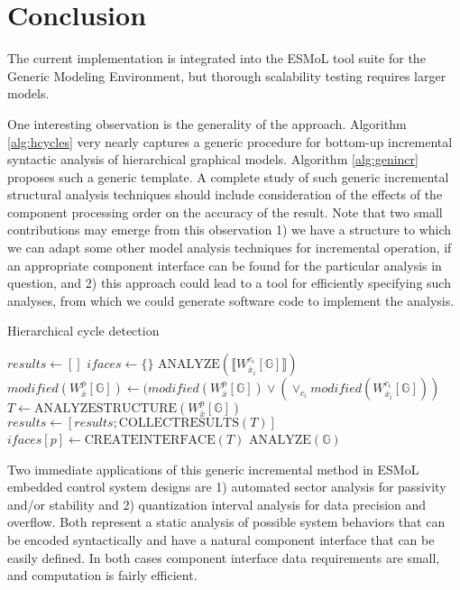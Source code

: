 \section{Conclusion}

The current implementation is integrated into the ESMoL tool suite for the Generic Modeling Environment\cite{mic:gme}, but thorough scalability testing requires larger models.

One interesting observation is the generality of the approach.  Algorithm 
\ref{alg:hcycles} very nearly captures a generic procedure for bottom-up incremental syntactic analysis of hierarchical graphical models.  Algorithm \ref{alg:genincr} proposes such a generic template.  A complete study of such generic 
incremental structural analysis techniques should include consideration of the effects of the component processing order on the accuracy of the result.  Note that two small contributions may emerge from this observation 1) we have a structure to which we can adapt some other model analysis techniques for incremental operation, if an appropriate component interface can be found for the particular analysis in question, and 2) this approach could lead to a tool for efficiently specifying such analyses, from which we could generate software code to implement the analysis.

\begin{algorithm}[H]
\caption{Hierarchical cycle detection}
\label{alg:genincr}
\begin{algorithmic}[1]
\State $results \gets [ ]$
\State $ifaces \gets \{ \}$
      \State ${\scriptstyle \mathrm{ANALYZE}}( \llbracket W_{\bar{x}_i}^{c_i} [\mathbb{G}] \rrbracket )$
   \EndFor
   \State $modified( W_{\bar{x}}^p [\mathbb{G}]) \gets (modified( W_{\bar{x}}^p [\mathbb{G}]) \vee ( \vee_{c_i} modified( W_{\bar{x}_i}^{c_i} [\mathbb{G}] ) )$
      \State $T \gets {\scriptstyle \mathrm{ANALYZESTRUCTURE}}(W_{\bar{x}}^p [\mathbb{G}])$
      \State $results \gets [ results; {\scriptstyle \mathrm{COLLECTRESULTS}}( T ) ]$
      \State $ifaces[p] \gets {\scriptstyle \mathrm{CREATEINTERFACE}}(T)$
   \EndIf
\EndFunction
\State ${\scriptstyle \mathrm{ANALYZE}}( \mathbb{G}) $
\end{algorithmic}
\end{algorithm}

Two immediate applications of this generic incremental method in ESMoL embedded control system designs are 1) automated sector analysis for passivity and/or stability \cite{pass:validation} and 2) quantization interval analysis for data precision and overflow.  Both represent a static analysis of possible system behaviors that can be encoded syntactically and have a natural component interface that can be easily defined.  In both cases component interface data requirements are small, and computation is fairly efficient.
